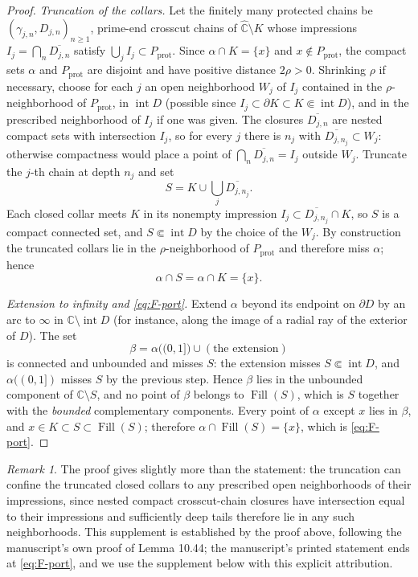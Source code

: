 \documentclass[11pt,reqno]{amsart}
\theoremstyle{definition}
\theoremstyle{remark}
\newtheorem{remark}[theorem]{Remark}
\newcommand{\C}{\mathbb C}
\newcommand{\Chat}{\widehat{\mathbb C}}
\newcommand{\Fill}{\operatorname{Fill}}
\newcommand{\Int}{\operatorname{int}}
\begin{document}
\begin{proof}
\emph{Truncation of the collars.}
Let the finitely many protected chains be
$(\gamma_{j,n},D_{j,n})_{n\ge1}$, prime-end crosscut chains of
$\Chat\setminus K$ whose impressions
$I_j=\bigcap_n\overline{D_{j,n}}$ satisfy
$\bigcup_jI_j\subset P_{\mathrm{prot}}$.  Since $\alpha\cap K=\{x\}$ and
$x\notin P_{\mathrm{prot}}$, the compact sets $\alpha$ and
$P_{\mathrm{prot}}$ are disjoint and have positive distance $2\rho>0$.
Shrinking $\rho$ if necessary, choose for each $j$ an open neighborhood
$W_j$ of $I_j$ contained in the $\rho$-neighborhood of
$P_{\mathrm{prot}}$, in $\Int D$ (possible since
$I_j\subset\partial K\subset K\Subset\Int D$), and in the prescribed
neighborhood of $I_j$ if one was given.  The closures
$\overline{D_{j,n}}$ are nested compact sets with intersection $I_j$, so
for every $j$ there is $n_j$ with
$\overline{D_{j,n_j}}\subset W_j$: otherwise compactness would place a
point of $\bigcap_n\overline{D_{j,n}}=I_j$ outside $W_j$.  Truncate the
$j$-th chain at depth $n_j$ and set
\[
S=K\cup\bigcup_j\overline{D_{j,n_j}} .
\]
Each closed collar meets $K$ in its nonempty impression
$I_j\subset\overline{D_{j,n_j}}\cap K$, so $S$ is a compact connected
set, and $S\Subset\Int D$ by the choice of the $W_j$.  By construction
the truncated collars lie in the $\rho$-neighborhood of
$P_{\mathrm{prot}}$ and therefore miss $\alpha$; hence
\[
\alpha\cap S=\alpha\cap K=\{x\}.
\]

\emph{Extension to infinity and \eqref{eq:F-port}.}
Extend $\alpha$ beyond its endpoint on $\partial D$ by an arc to
$\infty$ in $\C\setminus\Int D$ (for instance, along the image of a
radial ray of the exterior of $D$).  The set
\[
\beta=\alpha\bigl((0,1]\bigr)\cup(\text{the extension})
\]
is connected and unbounded and misses $S$: the extension misses
$S\Subset\Int D$, and $\alpha((0,1])$ misses $S$ by the previous step.
Hence $\beta$ lies in the unbounded component of $\C\setminus S$, and no
point of $\beta$ belongs to $\Fill(S)$, which is $S$ together with the
\emph{bounded} complementary components.  Every point of $\alpha$ except
$x$ lies in $\beta$, and $x\in K\subset S\subset\Fill(S)$; therefore
$\alpha\cap\Fill(S)=\{x\}$, which is \eqref{eq:F-port}.
\end{proof}

\begin{remark}\label{rem:F-collar-confinement}
The proof gives slightly more than the statement: the truncation can
confine the truncated closed collars to any prescribed open
neighborhoods of their impressions, since nested compact crosscut-chain
closures have intersection equal to their impressions and sufficiently
deep tails therefore lie in any such neighborhoods.  This supplement is
established by the proof above, following the manuscript's own proof of
Lemma 10.44; the manuscript's printed statement ends at
\eqref{eq:F-port}, and we use the supplement below with this explicit
attribution.
\end{remark}
\end{document}

